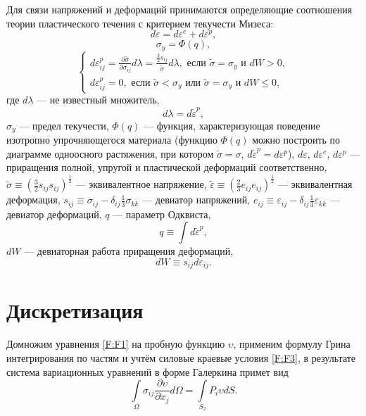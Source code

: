 \documentclass[]{article}
\begin{document}
Для связи напряжений и деформаций принимаются определяющие соотношения теории пластического течения \cite{Korobeynikov2000} с критерием текучести Мизеса:
\begin{equation}
d\varepsilon=d\varepsilon^{e} + d\varepsilon^{p},
\label{F:F_Flow1}
\end{equation}
\begin{equation}
\sigma_{y}=\Phi\left(q\right),
\label{F:F_Flow2}
\end{equation}
\begin{equation}
\begin{cases}
d\varepsilon_{ij}^{p}=\frac{\partial\tilde{\sigma}}{\partial\sigma_{ij}}d\lambda=\frac{\frac{3}{2}s_{ij}}{\tilde{\sigma}} d\lambda, \mbox{ если } \tilde{\sigma}=\sigma_{y} \mbox{ и } dW>0, \\
d\varepsilon_{ij}^{p}=0, \mbox{ если } \tilde{\sigma}<\sigma_{y} \mbox{ или } \tilde{\sigma}=\sigma_{y} \mbox{ и } dW\leq 0,
\end{cases}
\label{F:F_Flow3}
\end{equation}
где $d\lambda$ --- не известный множитель,
\begin{equation}
d\lambda=d\tilde{\varepsilon}^{p},
\label{F:F_FlowDef1}
\end{equation}
$\sigma_{y}$ --- предел текучести, $\Phi\left(q\right)$ --- функция, характеризующая поведение изотропно упрочняющегося материала (функцию $\Phi\left(q\right)$ можно построить по диаграмме одноосного растяжения, при котором $\tilde{\sigma}=\sigma$, $d\tilde{\varepsilon}^{p}=d\varepsilon^{p}$),
$d\varepsilon$, $d\varepsilon^{e}$, $d\varepsilon^{p}$ --- приращения полной, упругой и пластической деформаций соответственно, $\tilde{\sigma}\equiv\left(\frac{3}{2}s_{ij}s_{ij}\right)^{\frac{1}{2}}$ --- эквивалентное напряжение, $\tilde{\varepsilon}\equiv \left(\frac{2}{3}e_{ij}e_{ij}\right)^{\frac{1}{2}}$ --- эквивалентная деформация, $s_{ij}\equiv\sigma_{ij}-\delta_{ij}\frac{1}{3}\sigma_{kk}$ --- девиатор напряжений, $e_{ij}\equiv\varepsilon_{ij}-\delta_{ij}\frac{1}{3}\varepsilon_{kk}$ --- девиатор деформаций, $q$ --- параметр Одквиста,
\begin{equation}
q\equiv\int d\tilde{\varepsilon}^{p},
\label{F:F_FlowDef6}
\end{equation}
$dW$ --- девиаторная работа приращения деформаций,
\begin{equation}
dW\equiv s_{ij}d\varepsilon_{ij}.
\label{F:F_FlowDef7}
\end{equation}


\section{Дискретизация}
Домножим уравнения \eqref{F:F1} на пробную функцию $\upsilon$, применим формулу Грина интегрирования по частям и учтём силовые краевые условия \eqref{F:F3}, в результате система вариационных уравнений в форме Галеркина примет вид \cite{SoloveychikRoyakPersova2007}
\begin{equation}
\int\limits_{\Omega}\sigma_{ij}\frac{\partial\upsilon}{\partial x_j}  d\Omega=\int\limits_{S_{2}}P_{i} \upsilon dS.
\label{F:F_var2}
\end{equation}
\end{document}
